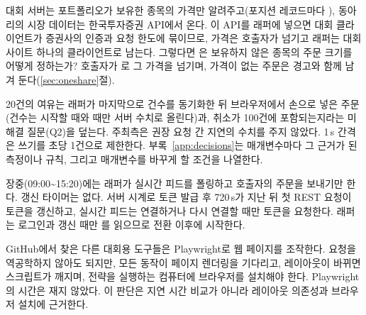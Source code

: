 \seclabel
{}

 대회 서버는 포트폴리오가 보유한 종목의 가격만 알려주고(포지션 레코드마다 ), 동아리의 시장 데이터는 한국투자증권 API에서 온다. 이 API를 래퍼에 넣으면 대회 클라이언트가 증권사의 인증과 요청 한도에 묶이므로, 가격은 호출자가 넘기고 래퍼는 대회 사이트 하나의 클라이언트로 남는다. 그렇다면 은 보유하지 않은 종목의 주문 크기를 어떻게 정하는가? 호출자가 로 그 가격을 넘기며, 가격이 없는 주문은 경고와 함께 남겨 둔다(\ref{sec:oneshare}절).



 20건의 여유는 래퍼가 마지막으로 건수를 동기화한 뒤 브라우저에서 손으로 넣은 주문(건수는 시작할 때와  때만 서버 수치로 올린다)과, 취소가 100건에 포함되는지라는 미해결 질문(Q2)을 덮는다. 주최측은 권장 요청 간 지연의 수치를 주지 않았다. 1\,s 간격은 쓰기를 초당 1건으로 제한한다. 부록~\ref{app:decisions}는 매개변수마다 그 근거가 된 측정이나 규칙, 그리고 매개변수를 바꾸게 할 조건을 나열한다.

 장중(09:00\textasciitilde 15:20)에는 래퍼가 실시간 피드를 폴링하고 호출자의 주문을 보내기만 한다. 갱신 타이머는 없다. 서버 시계로 토큰 발급 후 720\,s가 지난 뒤 첫 REST 요청이 토큰을 갱신하고, 실시간 피드는 연결하거나 다시 연결할 때만 토큰을 요청한다. 래퍼는 로그인과 갱신 때만 를 읽으므로 전환 이후에 시작한다.



 GitHub에서 찾은 다른 대회용 도구들은 Playwright로 웹 페이지를 조작한다. 요청을 역공학하지 않아도 되지만, 모든 동작이 페이지 렌더링을 기다리고, 레이아웃이 바뀌면 스크립트가 깨지며, 전략을 실행하는 컴퓨터에 브라우저를 설치해야 한다. Playwright의 시간은 재지 않았다. 이 판단은 지연 시간 비교가 아니라 레이아웃 의존성과 브라우저 설치에 근거한다.

